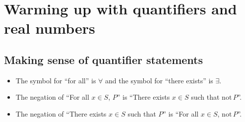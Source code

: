 \documentclass[12pt]{amsart}
\begin{document}
	
	\thispagestyle{empty}
	
	\section*{Warming up with quantifiers and real numbers}
	
\subsection*{Making sense of quantifier statements}


\begin{framed}
\begin{itemize}
\item The symbol for ``for all'' is $\forall$ and the symbol for ``there exists'' is $\exists$.
\item The negation of ``For all $x\in S$, $P$'' is ``There exists $x\in S$ such that $\mathrm{not} \, P$''.
\item The negation of ``There exists $x\in S$ such that $P$'' is ``For all $x\in S$, $\mathrm{not} \, P$''.
\end{itemize}
\end{framed}

\
\end{document}
